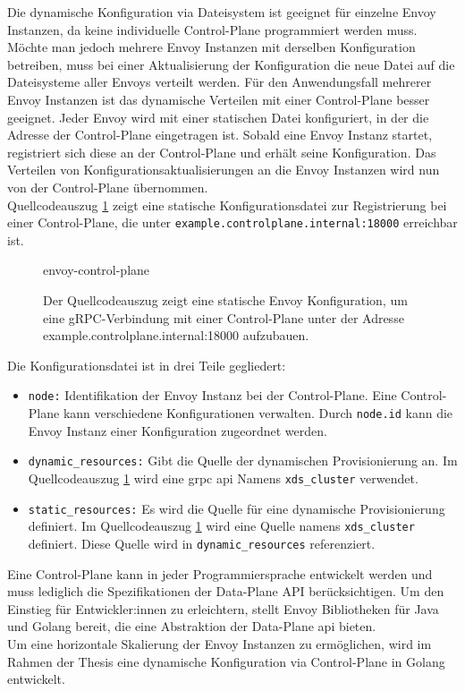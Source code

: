 Die dynamische Konfiguration via Dateisystem ist geeignet für einzelne Envoy Instanzen, da keine individuelle Control-Plane programmiert werden muss.
Möchte man jedoch mehrere Envoy Instanzen mit derselben Konfiguration betreiben, muss bei einer Aktualisierung der Konfiguration die neue Datei auf die Dateisysteme aller Envoys verteilt werden.
Für den Anwendungsfall mehrerer Envoy Instanzen ist das dynamische Verteilen mit einer Control-Plane besser geeignet. Jeder Envoy wird mit einer statischen Datei konfiguriert, in der die Adresse der Control-Plane eingetragen ist. Sobald eine Envoy Instanz startet, registriert sich diese an der Control-Plane und erhält seine Konfiguration. Das Verteilen von Konfigurationsaktualisierungen an die Envoy Instanzen wird nun von der Control-Plane übernommen.
\\
Quellcodeauszug \ref{code:envoy-control-plane} zeigt eine statische Konfigurationsdatei zur Registrierung bei einer Control-Plane, die unter \verb|example.controlplane.internal:18000| erreichbar ist.
\begin{figure}
    {envoy-control-plane}
    \caption[Statische Envoy Konfiguration, um eine gRPC-Verbindung mit einer Control-Plane aufzubauen.]{Der Quellcodeauszug zeigt eine statische Envoy Konfiguration, um eine gRPC-Verbindung mit einer Control-Plane unter der Adresse {example.controlplane.internal:18000} aufzubauen.}
    \label{code:envoy-control-plane}
\end{figure}
Die Konfigurationsdatei ist in drei Teile gegliedert:
\begin{itemize}
  \item \verb|node:| Identifikation der Envoy Instanz bei der Control-Plane. Eine Control-Plane kann verschiedene Konfigurationen verwalten. Durch \verb|node.id| kann die Envoy Instanz einer Konfiguration zugeordnet werden.
  \item \verb|dynamic_resources:| Gibt die Quelle der dynamischen Provisionierung an. Im Quellcodeauszug \ref{code:envoy-control-plane} wird eine g\acs{rpc} \ac{api} Namens \verb|xds_cluster| verwendet.
  \item \verb|static_resources:| Es wird die Quelle für eine dynamische Provisionierung definiert. Im Quellcodeauszug \ref{code:envoy-control-plane} wird eine Quelle namens \verb|xds_cluster| definiert. Diese Quelle wird in \verb|dynamic_resources| referenziert.
\end{itemize}
Eine Control-Plane kann in jeder Programmiersprache entwickelt werden und muss lediglich die Spezifikationen der Data-Plane API \cite{EnvoyproxyDataplaneapi2021} berücksichtigen. Um den Einstieg für Entwickler:innen zu erleichtern, stellt Envoy Bibliotheken für Java und Golang bereit, die eine Abstraktion der Data-Plane \ac{api} bieten.
\\
Um eine horizontale Skalierung der Envoy Instanzen zu ermöglichen, wird im Rahmen der Thesis eine dynamische Konfiguration via Control-Plane in Golang entwickelt.

